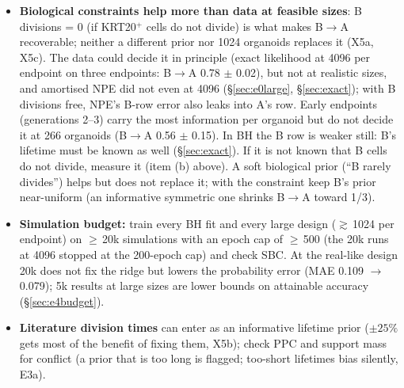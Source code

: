 \documentclass[10pt,a4paper]{article}
\begin{document}
\begin{itemize}
\begin{enumerate}[label=(\alph*)]
  \item \emph{mis-typing rate} (2D vs 3D comparison), above all how often LGR5$^+$ cells are called KRT20$^+$ (the harmful direction, \S\ref{sec:e2asym}), and pass it to the model as an asymmetric confusion: ignored, it is tolerable only up to $e \approx 0.05$ once posteriors are as narrow as in GW;
  \item \emph{cell-cycle variability}: only whether CV is $<0.5$ or near-exponential;
  \item \emph{founder type} and \emph{quiescence} (e.g.\ Ki67) if they matter biologically --- the counts cannot provide them;
  \item \emph{apoptosis} only if death rates are to be fixed; otherwise keep them free (a value too high biases B$\to$A; in BH silently).
  \end{enumerate}
\item \textbf{Biological constraints help more than data at feasible sizes}: B divisions = 0 (if KRT20$^+$ cells do not divide) is what makes B$\to$A recoverable; neither a different prior nor 1024 organoids replaces it (X5a, X5c). The data could decide it in principle (exact likelihood at 4096 per endpoint on three endpoints: B$\to$A 0.78 $\pm$ 0.02), but not at realistic sizes, and amortised NPE did not even at 4096 (\S\ref{sec:e0large}, \S\ref{sec:exact}); with B divisions free, NPE's B-row error also leaks into A's row. Early endpoints (generations 2--3) carry the most information per organoid but do not decide it at 266 organoids (B$\to$A 0.56 $\pm$ 0.15). In BH the B row is weaker still: B's lifetime must be known as well (\S\ref{sec:exact}). If it is not known that B cells do not divide, measure it (item (b) above). A soft biological prior (``B rarely divides'') helps but does not replace it; with the constraint keep B's prior near-uniform (an informative symmetric one shrinks B$\to$A toward 1/3).
\item \textbf{Simulation budget:} train every BH fit and every large design ($\gtrsim$\,1024 per endpoint) on $\ge$\,20k simulations with an epoch cap of $\ge$\,500 (the 20k runs at 4096 stopped at the 200-epoch cap) and check SBC. At the real-like design 20k does not fix the ridge but lowers the probability error (MAE 0.109 $\to$ 0.079); 5k results at large sizes are lower bounds on attainable accuracy (\S\ref{sec:e4budget}).
\item \textbf{Literature division times} can enter as an informative lifetime prior ($\pm 25\%$ gets most of the benefit of fixing them, X5b); check PPC and support mass for conflict (a prior that is too long is flagged; too-short lifetimes bias silently, E3a).

\end{itemize}
\end{document}
